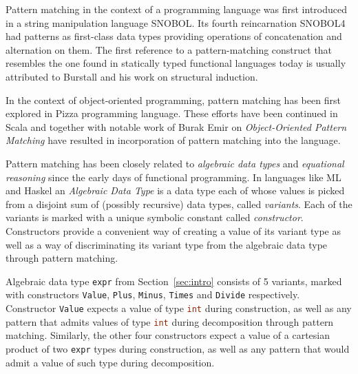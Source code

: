 \documentclass[preprint]{sigplanconf}
\DeclareRobustCommand{\codeocaml}[1]{{\lstinline[breaklines=false,language=Caml]{#1}}}
\begin{document}
Pattern matching in the context of a programming language was first introduced 
in a string manipulation language SNOBOL\cite{SNOBOL64}. Its fourth 
reincarnation SNOBOL4 had patterns as first-class data types providing 
operations of concatenation and alternation on them\cite{SNOBOL71}. The first 
reference to a pattern-matching construct that resembles the one found in 
statically typed functional languages today is usually attributed to Burstall 
and his work on structural induction\cite{Burstall69provingproperties}.


In the context of object-oriented programming, pattern matching has been first 
explored in Pizza programming language\cite{Odersky97pizzainto}. These efforts 
have been continued in Scala\cite{Scala2nd} and together with notable work of 
Burak Emir on \emph{Object-Oriented Pattern Matching}\cite{EmirThesis} have 
resulted in incorporation of pattern matching into the language.



Pattern matching has been closely related to \emph{algebraic data types} and 
\emph{equational reasoning} since the early days of functional programming.
In languages like ML and Haskel an \emph{Algebraic Data Type} is a data type 
each of whose values is picked from a disjoint sum of (possibly recursive) data 
types, called \emph{variants}. Each of the variants is marked with a unique 
symbolic constant called \emph{constructor}. Constructors provide a 
convenient way of creating a value of its variant type as well as a way of 
discriminating its variant type from the algebraic data type through pattern 
matching.

Algebraic data type \codeocaml{expr} from Section~\ref{sec:intro} consists of 5 
variants, marked with constructors \codeocaml{Value}, \codeocaml{Plus}, 
\codeocaml{Minus}, \codeocaml{Times} and \codeocaml{Divide} respectively. 
Constructor \codeocaml{Value} expects a value of type \codeocaml{int} during 
construction, as well as any pattern that admits values of type \codeocaml{int} 
during decomposition through pattern matching. Similarly, the other four 
constructors expect a value of a cartesian product of two \codeocaml{expr} 
types during construction, as well as any pattern that would admit a value of 
such type during decomposition.
\end{document}
